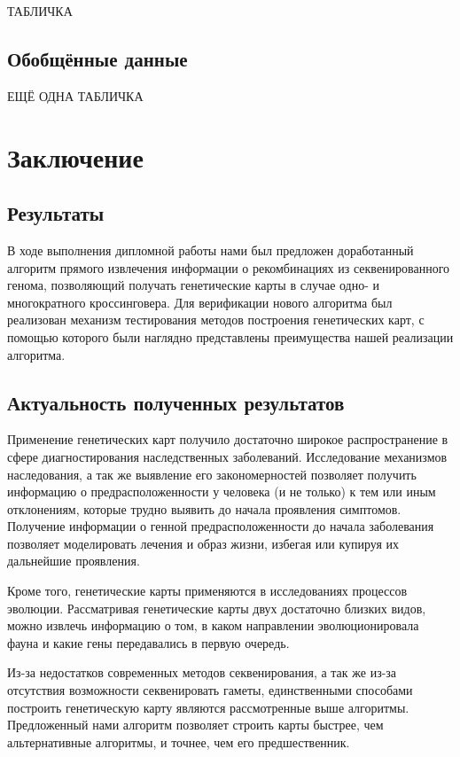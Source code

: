 \documentclass{matmex-diploma-custom}
\begin{document}
ТАБЛИЧКА

\subsection{Обобщённые данные}

ЕЩЁ ОДНА ТАБЛИЧКА

\section*{Заключение}

\subsection*{Результаты}

В ходе выполнения дипломной работы нами был предложен доработанный
алгоритм прямого извлечения информации о рекомбинациях из
секвенированного генома, позволяющий получать генетические карты в
случае одно- и многократного кроссинговера.  Для верификации нового
алгоритма был реализован механизм тестирования методов построения
генетических карт, с помощью которого были наглядно представлены
преимущества нашей реализации алгоритма.

\subsection*{Актуальность полученных результатов}

Применение генетических карт получило достаточно широкое
распространение в сфере диагностирования наследственных
заболеваний. Исследование механизмов наследования, а так же выявление
его закономерностей позволяет получить информацию о
предрасположенности у человека (и не только) к тем или иным
отклонениям, которые трудно выявить до начала проявления
симптомов. Получение информации о генной предрасположенности до начала
заболевания позволяет моделировать лечения и образ жизни, избегая или
купируя их дальнейшие проявления.

Кроме того, генетические карты применяются в исследованиях процессов
эволюции. Рассматривая генетические карты двух достаточно близких
видов, можно извлечь информацию о том, в каком направлении
эволюционировала фауна и какие гены передавались в первую очередь.

Из-за недостатков современных методов секвенирования, а так же из-за
отсутствия возможности секвенировать гаметы, единственными способами
построить генетическую карту являются рассмотренные выше
алгоритмы. Предложенный нами алгоритм позволяет строить карты быстрее,
чем альтернативные алгоритмы, и точнее, чем его предшественник.



\end{document}
